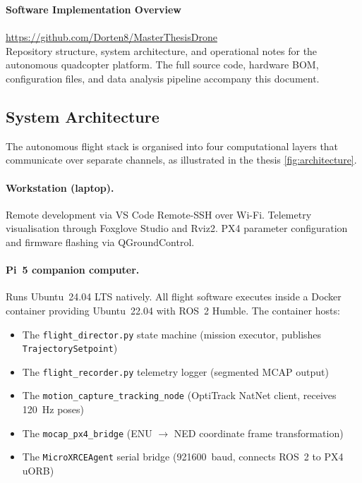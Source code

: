 \clearpage
\begin{center}
    \vspace*{4cm}
    {\LARGE\textbf{Software Implementation Overview}} \\[2em]
     \\[1em]
    {\small\url{https://github.com/Dorten8/MasterThesisDrone}} \\[2em]
    \large{Repository structure, system architecture, and operational notes for the autonomous quadcopter platform. The full source code, hardware BOM, configuration files, and data analysis pipeline accompany this document.}
    \vfill
\end{center}
\clearpage

\subsection{System Architecture}
\label{sec:appendix_architecture}

The autonomous flight stack is organised into four computational layers that communicate over separate channels, as illustrated in the thesis \autoref{fig:architecture}.

\paragraph{Workstation (laptop).} Remote development via VS Code Remote-SSH over Wi-Fi. Telemetry visualisation through Foxglove Studio and Rviz2. PX4 parameter configuration and firmware flashing via QGroundControl.

\paragraph{Pi~5 companion computer.} Runs Ubuntu~24.04 LTS natively. All flight software executes inside a Docker container providing Ubuntu~22.04 with ROS~2 Humble. The container hosts:
\begin{itemize}
    \item The \texttt{flight\_director.py} state machine (mission executor, publishes \texttt{TrajectorySetpoint})
    \item The \texttt{flight\_recorder.py} telemetry logger (segmented MCAP output)
    \item The \texttt{motion\_capture\_tracking\_node} (OptiTrack NatNet client, receives 120~Hz poses)
    \item The \texttt{mocap\_px4\_bridge} (ENU $\to$ NED coordinate frame transformation)
    \item The \texttt{MicroXRCEAgent} serial bridge (921600~baud, connects ROS~2 to PX4 uORB)
\end{itemize}

